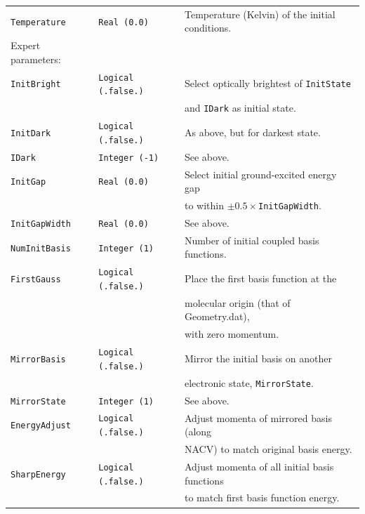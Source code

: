 \documentclass[11pt]{article}
\begin{document}
\begin{table}[h]
\begin{tabular}{ l l l }
{\tt Temperature}    &{\tt Real (0.0)}          & {\small Temperature (Kelvin) of the initial conditions.}\\
Expert parameters:\\
{\tt InitBright}     &{\tt Logical (.false.)}   & {\small Select optically brightest of {\tt InitState}}\\&&
                                                  {\small and {\tt IDark} as initial state.}\\
{\tt InitDark}       &{\tt Logical (.false.)}   & {\small As above, but for darkest state.}\\
{\tt IDark}          &{\tt Integer (-1)}        & {\small See above.}\\
{\tt InitGap}        &{\tt Real (0.0)}          & {\small Select initial ground-excited energy gap}\\&&
                                                  {\small to within $\pm 0.5\times${\tt InitGapWidth}.}\\
{\tt InitGapWidth}   &{\tt Real (0.0)}          & {\small See above.}\\
{\tt NumInitBasis}   &{\tt Integer (1)}         & {\small Number of initial coupled basis functions.}\\
{\tt FirstGauss}     &{\tt Logical (.false.)}   & {\small Place the first basis function at the}\\&&
                                                  {\small molecular origin (that of Geometry.dat),}\\&&
                                                  {\small with zero momentum.}\\
{\tt MirrorBasis}    &{\tt Logical (.false.)}   & {\small Mirror the initial basis on another }\\&&
                                                  {\small electronic state, {\tt MirrorState}.}\\
{\tt MirrorState}    &{\tt Integer (1)}         & {\small See above.}\\
{\tt EnergyAdjust}   &{\tt Logical (.false.)}   & {\small Adjust momenta of mirrored basis (along}\\&&
                                                  {\small NACV) to match original basis energy.}\\
{\tt SharpEnergy}    &{\tt Logical (.false.)}   & {\small Adjust momenta of all initial basis functions}\\&&
                                                  {\small to match first basis function energy.}\\
\hline\hline
\end{tabular}
\end{table}
\end{document}
